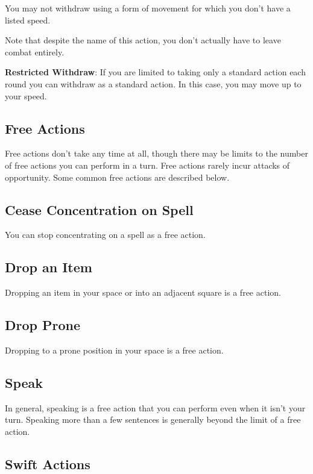 You may not withdraw using a form of movement for which you don't have a listed speed. 
				
Note that despite the name of this action, you don't actually have to leave combat entirely.
				
\textbf{Restricted Withdraw}: If you are limited to taking only a standard action each round you can withdraw as a standard action. In this case, you may move up to your speed.
				
\subsection{Free Actions}

				
Free actions don't take any time at all, though there may be limits to the number of free actions you can perform in a turn. Free actions rarely incur attacks of opportunity. Some common free actions are described below.
				
\subsection{Cease Concentration on Spell}

				
You can stop concentrating on a spell as a free action.
				
\subsection{Drop an Item}

				
Dropping an item in your space or into an adjacent square is a free action.
				
\subsection{Drop Prone}

				
Dropping to a prone position in your space is a free action.
				
\subsection{Speak}

				
In general, speaking is a free action that you can perform even when it isn't your turn. Speaking more than a few sentences is generally beyond the limit of a free action.
				
\subsection{Swift Actions}

